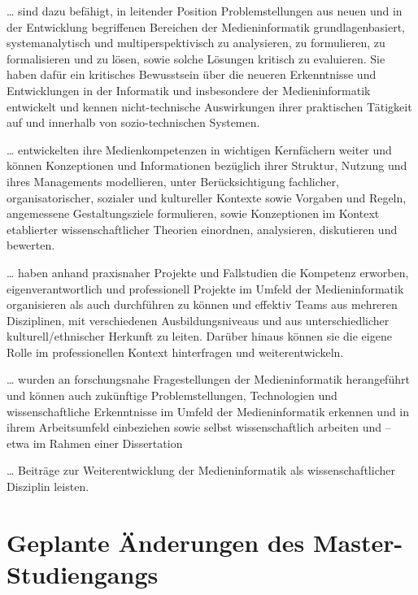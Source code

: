 \ldots{} sind dazu befähigt, in leitender Position Problemstellungen aus
neuen und in der Entwicklung begriffenen Bereichen der Medieninformatik
grundlagenbasiert, systemanalytisch und multiperspektivisch zu
analysieren, zu formulieren, zu formalisieren und zu lösen, sowie solche
Lösungen kritisch zu evaluieren. Sie haben dafür ein kritisches
Bewusstsein über die neueren Erkenntnisse und Entwicklungen in der
Informatik und insbesondere der Medieninformatik entwickelt und kennen
nicht-technische Auswirkungen ihrer praktischen Tätigkeit auf und
innerhalb von sozio-technischen Systemen.

\ldots{} entwickelten ihre Medienkompetenzen in wichtigen Kernfächern
weiter und können Konzeptionen und Informationen bezüglich ihrer
Struktur, Nutzung und ihres Managements modellieren, unter
Berücksichtigung fachlicher, organisatorischer, sozialer und kultureller
Kontexte sowie Vorgaben und Regeln, angemessene Gestaltungsziele
formulieren, sowie Konzeptionen im Kontext etablierter
wissenschaftlicher Theorien einordnen, analysieren, diskutieren und
bewerten.

\ldots{} haben anhand praxisnaher Projekte und Fallstudien die Kompetenz
erworben, eigenverantwortlich und professionell Projekte im Umfeld der
Medieninformatik organisieren als auch durchführen zu können und
effektiv Teams aus mehreren Disziplinen, mit verschiedenen
Ausbildungsniveaus und aus unterschiedlicher kulturell/ethnischer
Herkunft zu leiten. Darüber hinaus können sie die eigene Rolle im
professionellen Kontext hinterfragen und weiterentwickeln.

\ldots{} wurden an forschungsnahe Fragestellungen der Medieninformatik
herangeführt und können auch zukünftige Problemstellungen, Technologien
und wissenschaftliche Erkenntnisse im Umfeld der Medieninformatik
erkennen und in ihrem Arbeitsumfeld einbeziehen sowie selbst
wissenschaftlich arbeiten und -- etwa im Rahmen einer Dissertation

\ldots{} Beiträge zur Weiterentwicklung der Medieninformatik als
wissenschaftlicher Disziplin leisten.

\section{Geplante Änderungen des
Master-Studiengangs}\label{geplante-uxe4nderungen-des-master-studiengangs}

